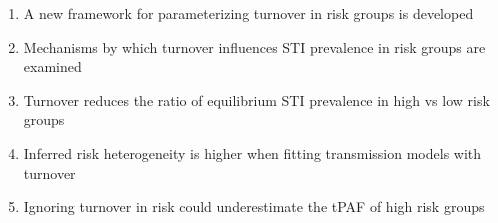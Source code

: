 \begin{enumerate}
  \item A new framework for parameterizing turnover in risk groups is developed
  \item Mechanisms by which turnover influences STI prevalence in risk groups are examined
  \item Turnover reduces the ratio of equilibrium STI prevalence in high vs low risk groups
  \item Inferred risk heterogeneity is higher when fitting transmission models with turnover
  \item Ignoring turnover in risk could underestimate the tPAF of high risk groups
\end{enumerate}
